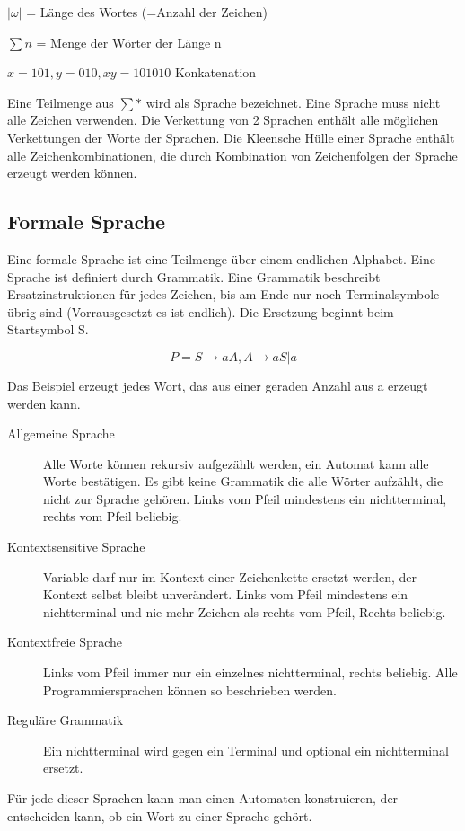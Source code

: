 \documentclass[a4paper]{scrartcl}
\begin{document}
            $|\omega|$ = Länge des Wortes (=Anzahl der Zeichen)

            $\sum n$ = Menge der Wörter der Länge n

            $x=101, y = 010, xy = 101010$ Konkatenation

            Eine Teilmenge aus $\sum*$ wird als Sprache bezeichnet. Eine Sprache muss nicht alle Zeichen verwenden. Die Verkettung von 2 Sprachen enthält alle möglichen Verkettungen der Worte der Sprachen. Die Kleensche Hülle einer Sprache enthält alle Zeichenkombinationen, die durch Kombination von Zeichenfolgen der Sprache erzeugt werden können.
        \subsection{Formale Sprache}
            Eine formale Sprache ist eine Teilmenge über einem endlichen Alphabet. Eine Sprache ist definiert durch Grammatik. Eine Grammatik beschreibt Ersatzinstruktionen für jedes Zeichen, bis am Ende nur noch Terminalsymbole übrig sind (Vorrausgesetzt es ist endlich). Die Ersetzung beginnt beim Startsymbol S.

            $$ P = { S\rightarrow aA,
                     A\rightarrow aS | a}$$

            Das Beispiel erzeugt jedes Wort, das aus einer geraden Anzahl aus a erzeugt werden kann.

            \begin{description}
                \item[Allgemeine Sprache] Alle Worte können rekursiv aufgezählt werden, ein Automat kann alle Worte bestätigen. Es gibt keine Grammatik die alle Wörter aufzählt, die nicht zur Sprache gehören. Links vom Pfeil mindestens ein nichtterminal, rechts vom Pfeil beliebig.
                \item[Kontextsensitive Sprache] Variable darf nur im Kontext einer Zeichenkette ersetzt werden, der Kontext selbst bleibt unverändert. Links vom Pfeil mindestens ein nichtterminal und nie mehr Zeichen als rechts vom Pfeil, Rechts beliebig.
                \item[Kontextfreie Sprache] Links vom Pfeil immer nur ein einzelnes nichtterminal, rechts beliebig. Alle Programmiersprachen können so beschrieben werden.
                \item[Reguläre Grammatik] Ein nichtterminal wird gegen ein Terminal und optional ein nichtterminal ersetzt.  
            \end{description}
            Für jede dieser Sprachen kann man einen Automaten konstruieren, der entscheiden kann, ob ein Wort zu einer Sprache gehört.
\end{document}
